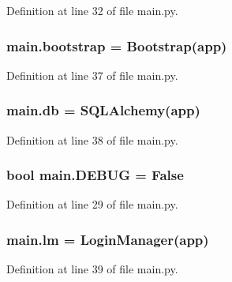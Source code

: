 Definition at line 32 of file main.\+py.

\subsubsection[{\texorpdfstring{bootstrap}{bootstrap}}]{\setlength{\rightskip}{0pt plus 5cm}main.\+bootstrap = Bootstrap({\bf app})}\hypertarget{namespacemain_a2799db3c64165e5659fada6c15d90aea}{}\label{namespacemain_a2799db3c64165e5659fada6c15d90aea}


Definition at line 37 of file main.\+py.

\subsubsection[{\texorpdfstring{db}{db}}]{\setlength{\rightskip}{0pt plus 5cm}main.\+db = S\+Q\+L\+Alchemy({\bf app})}\hypertarget{namespacemain_afadee2a30284fe18a4fee574c23c94e3}{}\label{namespacemain_afadee2a30284fe18a4fee574c23c94e3}


Definition at line 38 of file main.\+py.

\subsubsection[{\texorpdfstring{D\+E\+B\+UG}{DEBUG}}]{\setlength{\rightskip}{0pt plus 5cm}bool main.\+D\+E\+B\+UG = False}\hypertarget{namespacemain_ad2cce3c3d1036d38f161e4814c97e1b5}{}\label{namespacemain_ad2cce3c3d1036d38f161e4814c97e1b5}


Definition at line 29 of file main.\+py.

\subsubsection[{\texorpdfstring{lm}{lm}}]{\setlength{\rightskip}{0pt plus 5cm}main.\+lm = Login\+Manager({\bf app})}\hypertarget{namespacemain_aaf584fa2bbd608ba30fe2a84f4a6e604}{}\label{namespacemain_aaf584fa2bbd608ba30fe2a84f4a6e604}


Definition at line 39 of file main.\+py.

